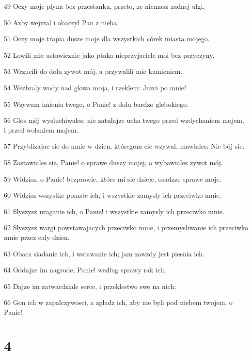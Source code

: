 \par 49 Oczy moje plyna bez przestanku, przeto, ze niemasz zadnej ulgi,
\par 50 Azby wejrzal i obaczyl Pan z nieba.
\par 51 Oczy moje trapia dusze moje dla wszystkich córek miasta mojego.
\par 52 Lowili mie ustawicznie jako ptaka nieprzyjaciele moi bez przyczyny.
\par 53 Wrzucili do dolu zywot mój, a przywalili mie kamieniem.
\par 54 Wezbraly wody nad glowa moja, i rzeklem: Juzci po mnie!
\par 55 Wzywam imienia twego, o Panie! z dolu bardzo glebokiego.
\par 56 Glos mój wysluchiwales; nie zatulajze ucha twego przed wzdychaniem mojem, i przed wolaniem mojem.
\par 57 Przyblizajac sie do mnie w dzien, któregom cie wzywal, mawiales: Nie bój sie.
\par 58 Zastawiales sie, Panie! o sprawe duszy mojej, a wybawiales zywot mój.
\par 59 Widzisz, o Panie! bezprawie, które mi sie dzieje, osadzze sprawe moje.
\par 60 Widzisz wszystke pomste ich, i wszystkie zamysly ich przeciwko mnie.
\par 61 Slyszysz uraganie ich, o Panie! i wszystkie zamysly ich przeciwko mnie.
\par 62 Slyszysz wargi powstawajacych przeciwko mnie, i przemysliwanie ich przeciwko mnie przez caly dzien.
\par 63 Obacz siadanie ich, i wstawanie ich; jam zawzdy jest piesnia ich.
\par 64 Oddajze im nagrode, Panie! wedlug sprawy rak ich;
\par 65 Dajze im zatwardziale serce, i przeklestwo swe na nich;
\par 66 Gon ich w zapalczywosci, a zgladz ich, aby nie byli pod niebem twojem, o Panie!

\chapter{4}

